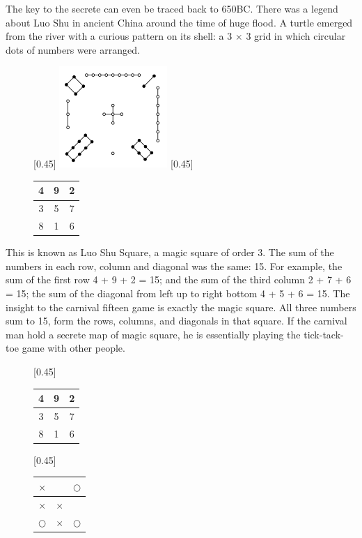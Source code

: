 \documentclass[UTF8]{article}
\begin{document}
The key to the secrete can even be traced back to 650BC. There was a legend about Luo Shu in ancient China around the time of huge flood. A turtle emerged from the river with a curious pattern on its shell: a 3 $\times$ 3 grid in which circular dots of numbers were arranged.

\begin{figure}[htbp]
 \centering
 [0.45\linewidth]{ \includegraphics[scale=0.6]{img/luo-shu.png}}
 [0.45\linewidth]{
   \begin{tabular}{|c|c|c|}
   \hline
   4 & 9 & 2 \\
   \hline
   3 & 5 & 7 \\
   \hline
   8 & 1 & 6 \\
   \hline
   \end{tabular}
   \vspace{8mm}
 }
 \captionsetup{labelformat=empty}
 \caption{}
 \label{fig:luo-shu}
\end{figure}

This is known as Luo Shu Square, a magic square of order 3. The sum of the numbers in each row, column and diagonal was the same: 15. For example, the sum of the first row 4 + 9 + 2 = 15; and the sum of the third column 2 + 7 + 6 = 15; the sum of the diagonal from left up to right bottom 4 + 5 + 6 = 15. The insight to the carnival fifteen game is exactly the magic square. All three numbers sum to 15, form the rows, columns, and diagonals in that square. If the carnival man hold a secrete map of magic square, he is essentially playing the tick-tack-toe game with other people.

\begin{figure}[htbp]
 \centering
 [0.45\linewidth]{
   \begin{tabular}{|c|c|c|}
   \hline
   4 & 9 & 2 \\
   \hline
   3 & 5 & 7 \\
   \hline
   8 & 1 & 6 \\
   \hline
   \end{tabular}
   \vspace{3mm}
 }
 [0.45\linewidth]{
   \begin{tabular}{c|c|c}
   $\times$ &  & $\bigcirc$ \\
   \hline
   $\times$ & $\times$ &  \\
   \hline
   $\bigcirc$ & $\times$ & $\bigcirc$ \\
   \end{tabular}
   \vspace{3mm}
 }
 \captionsetup{labelformat=empty}
 \caption{}
 \label{fig:bingo-magic-square}
\end{figure}
\end{document}
